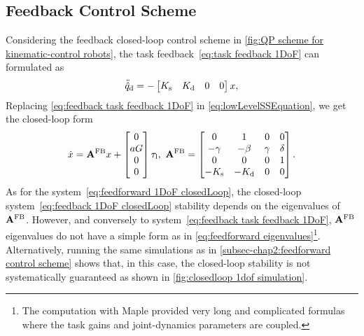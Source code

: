 \subsection{Feedback Control Scheme}\label{subsec-chap2:feedback control scheme}
Considering the feedback closed-loop control scheme in \cref{fig:QP scheme for kinematic-control robots}, the task feedback~\eqref{eq:task feedback 1DoF} can formulated as 
\begin{equation}\label{eq:feedback task feedback 1DoF}
	\ddot{\hat{q}}_{\rm d} = - \begin{bmatrix}
		 K_{\rm s} & K_{\rm d} &0 & 0 
	\end{bmatrix}x,  
\end{equation}
Replacing \cref{eq:feedback task feedback 1DoF} in \cref{eq:lowLevelSSEquation}, we get the closed-loop form
\begin{equation}\label{eq:feedback 1DoF closedLoop}
	\dot{x} = \mathbf{A}^{\rm FB}x + \begin{bmatrix}
		0 \\ aG \\ 0 \\ 0
	\end{bmatrix}\tau_{\rm l}, \ \mathbf{A}^{\rm FB} = 
	\begin{bmatrix}
		0 & 1 & 0 & 0 \\
		-\gamma & -\beta & \gamma & \delta \\ 
		0 & 0 & 0 & 1 \\ 
		-K_{\rm s} & -K_{\rm d} & 	0 & 0 
	\end{bmatrix}.
\end{equation}
As for the system~\eqref{eq:feedforward 1DoF closedLoop}, the closed-loop system~\eqref{eq:feedback 1DoF closedLoop} stability depends on the eigenvalues of $\mathbf{A}^{\rm FB}$. However, and conversely to system~\eqref{eq:feedback task feedback 1DoF}, $\mathbf{A}^{\rm FB}$ eigenvalues do not have a simple form as in \cref{eq:feedforward eigenvalues}\footnote{The computation with Maple provided very long and complicated formulas where the task gains and joint-dynamics parameters are coupled.}. Alternatively, running the same simulations as in \cref{subsec-chap2:feedforward control scheme} shows that, in this case, the closed-loop stability is not systematically guaranteed as shown in \cref{fig:closedloop 1dof simulation}.    
